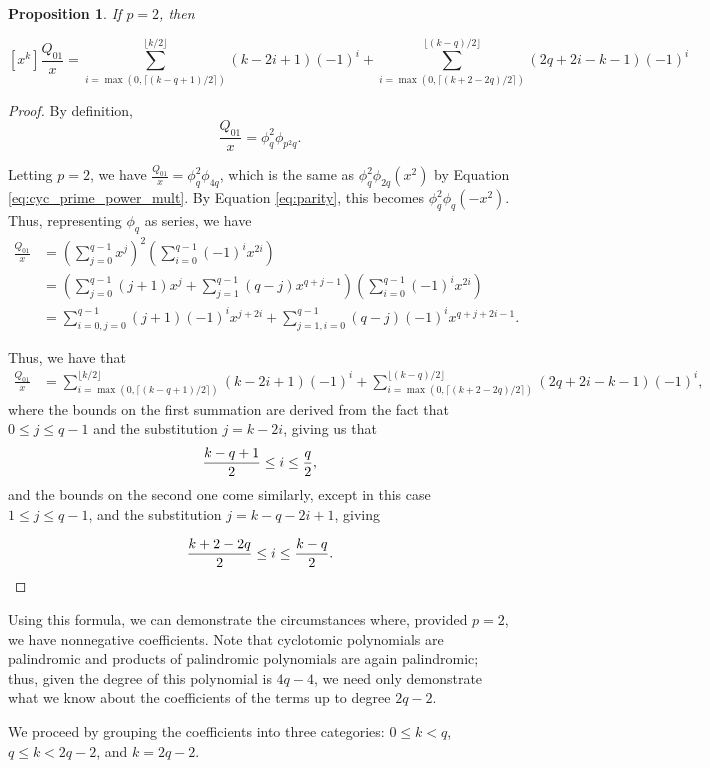 \documentclass[11pt]{amsart}
\numberwithin{equation}{section}
\theoremstyle{plain}
\newtheorem{proposition}[equation]{Proposition}
\theoremstyle{definition}
\begin{document}
\begin{proposition}
If $p=2$, then

$$[x^k]\frac{Q_{01}}{x}=\sum_{i=\max(0,\lceil (k-q+1)/2\rceil)}^{\lfloor {k/2}\rfloor}(k-2i+1)(-1)^i + \sum_{i=\max(0,\lceil (k+2-2q )/2\rceil)}^{\lfloor(k-q)/2\rfloor}(2q+2i-k-1)(-1)^i$$\label{prop:q01_form}
\end{proposition}
\begin{proof}
By definition, 
$$\frac{Q_{01}}{x} =\phi_q^2\phi_{p^2q}.$$

Letting $p=2$, we have $\frac{Q_{01}}{x} =\phi_q^2\phi_{4q}$, which is the same as $\phi_q^2\phi_{2q}(x^2)$ by Equation \eqref{eq:cyc_prime_power_mult}. By Equation \eqref{eq:parity}, this becomes
$\phi_q^2\phi_q(-x^2)$.
Thus, representing $\phi_q$ as series, we have
\begin{align*}
\frac{Q_{01}}{x}&=\left( \sum_{j=0}^{q-1}x^j\right)^2\left(\sum_{i=0}^{q-1}(-1)^ix^{2i}\right)\\
&=\left(\sum_{j=0}^{q-1}(j+1)x^j + \sum_{j=1}^{q-1}(q-j)x^{q+j-1}\right) \left(\sum_{i=0}^{q-1}(-1)^ix^{2i}\right)\\
&=\sum_{i=0,j=0}^{q-1}(j+1)(-1)^ix^{j+2i} + \sum_{j=1,i=0}^{q-1}(q-j)(-1)^ix^{q+j+2i-1}.
\end{align*}

Thus, we have that 
\begin{align*}
[x^k]\frac{Q_{01}}{x}&=\sum_{i=\max(0,\lceil (k-q+1)/2\rceil)}^{\lfloor {k/2}\rfloor}(k-2i+1)(-1)^i + \sum_{i=\max(0,\lceil (k+2-2q )/2\rceil)}^{\lfloor(k-q)/2\rfloor}(2q+2i-k-1)(-1)^i,
\end{align*}
where the bounds on the first summation are derived from the fact that $0\leq j\leq q-1$ and the substitution $j=k-2i$, giving us that \[{k-q+1\over 2}\leq i\leq {q\over 2},\]
and the bounds on the second one come similarly, except in this case $1\leq j\leq q-1$, and the substitution $j=k-q-2i+1$, giving

\[{k+2-2q \over 2} \leq i\leq {k-q\over 2}.\]
\end{proof}

Using this formula, we can demonstrate the circumstances where, provided $p=2$, we have nonnegative coefficients. Note that cyclotomic polynomials are palindromic and products of palindromic polynomials are again palindromic; thus, given the degree of this polynomial is $4q-4$, we need only demonstrate what we know about the coefficients of the terms up to degree $2q-2$. 

We proceed by grouping the coefficients into three categories: $0\leq k<q$, $q\leq k<2q-2$, and $k=2q-2$. 
\end{document}
